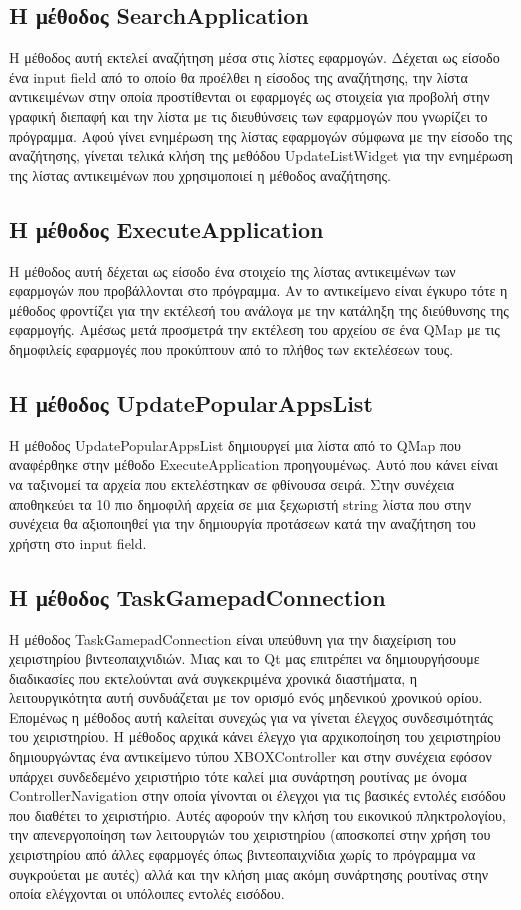 \subsection{Η μέθοδος SearchApplication}
Η μέθοδος αυτή εκτελεί αναζήτηση μέσα στις λίστες εφαρμογών. Δέχεται ως είσοδο ένα
input field από το οποίο θα προέλθει η είσοδος της αναζήτησης, την λίστα αντικειμένων
στην οποία προστίθενται οι εφαρμογές ως στοιχεία για προβολή στην γραφική διεπαφή και
την λίστα με τις διευθύνσεις των εφαρμογών που γνωρίζει το πρόγραμμα. Αφού γίνει ενημέρωση
της λίστας εφαρμογών σύμφωνα με την είσοδο της αναζήτησης, γίνεται τελικά κλήση της 
μεθόδου UpdateListWidget για την ενημέρωση της λίστας αντικειμένων που χρησιμοποιεί
η μέθοδος αναζήτησης. 


\subsection{Η μέθοδος ExecuteApplication}
Η μέθοδος αυτή δέχεται ως είσοδο ένα στοιχείο της λίστας αντικειμένων των εφαρμογών
που προβάλλονται στο πρόγραμμα. Αν το αντικείμενο είναι έγκυρο τότε η μέθοδος φροντίζει
για την εκτέλεσή του ανάλογα με την κατάληξη της διεύθυνσης της εφαρμογής. Αμέσως μετά
προσμετρά την εκτέλεση του αρχείου σε ένα QMap με τις δημοφιλείς εφαρμογές που προκύπτουν
από το πλήθος των εκτελέσεων τους.


\subsection{Η μέθοδος UpdatePopularAppsList}
Η μέθοδος UpdatePopularAppsList δημιουργεί μια λίστα από το QMap που αναφέρθηκε στην
μέθοδο ExecuteApplication προηγουμένως. Αυτό που κάνει είναι να ταξινομεί τα αρχεία που
εκτελέστηκαν σε φθίνουσα σειρά. Στην συνέχεια αποθηκεύει τα 10 πιο δημοφιλή αρχεία σε
μια ξεχωριστή string λίστα που στην συνέχεια θα αξιοποιηθεί για την δημιουργία προτάσεων
κατά την αναζήτηση του χρήστη στο input field.


\subsection{Η μέθοδος TaskGamepadConnection}
Η μέθοδος TaskGamepadConnection είναι υπεύθυνη για την διαχείριση του χειριστηρίου βιντεοπαιχνιδιών. 
Μιας και το Qt μας επιτρέπει να δημιουργήσουμε διαδικασίες που εκτελούνται ανά συγκεκριμένα 
χρονικά διαστήματα, η λειτουργικότητα αυτή συνδυάζεται με τον ορισμό ενός μηδενικού χρονικού 
ορίου. Επομένως η μέθοδος αυτή καλείται συνεχώς για να γίνεται έλεγχος συνδεσιμότητάς του
χειριστηρίου. Η μέθοδος αρχικά κάνει έλεγχο για αρχικοποίηση του χειριστηρίου δημιουργώντας ένα 
αντικείμενο τύπου XBOXController και στην συνέχεια εφόσον υπάρχει συνδεδεμένο χειριστήριο τότε 
καλεί μια συνάρτηση ρουτίνας με όνομα ControllerNavigation στην οποία γίνονται οι έλεγχοι για τις 
βασικές εντολές εισόδου που διαθέτει το χειριστήριο. Αυτές αφορούν την κλήση του εικονικού πληκτρολογίου, 
την απενεργοποίηση των λειτουργιών του χειριστηρίου (αποσκοπεί στην χρήση του χειριστηρίου από άλλες 
εφαρμογές όπως βιντεοπαιχνίδια χωρίς το πρόγραμμα να συγκρούεται με αυτές) αλλά και την κλήση μιας 
ακόμη συνάρτησης ρουτίνας στην οποία ελέγχονται οι υπόλοιπες εντολές εισόδου.




